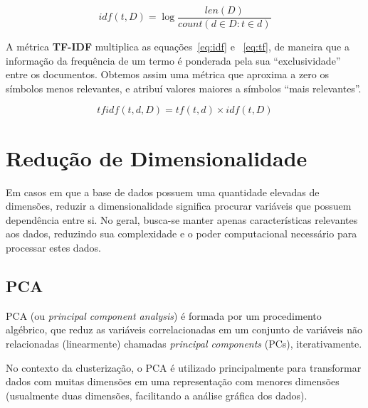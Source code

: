 \begin{equation}\label{eq:idf}
idf(t, D) = \log \frac{len(D)}{count(d \in D : t \in d)}
\end{equation}


A métrica \textbf{TF-IDF} multiplica as equações~\ref{eq:idf} e ~\ref{eq:tf}, de maneira que a informação da frequência de um termo é ponderada pela sua ``exclusividade'' entre os documentos.
Obtemos assim uma métrica que aproxima a zero os símbolos menos relevantes, e atribuí valores maiores a símbolos ``mais relevantes''.

\begin{equation}
tfidf(t, d, D) = tf(t, d) \times idf(t, D)
\end{equation}

 \section{Redução de Dimensionalidade}
 Em casos em que a base de dados possuem uma quantidade elevadas de dimensões, 
reduzir a dimensionalidade significa procurar variáveis que possuem dependência entre si.
No geral, busca-se manter apenas características relevantes aos dados, reduzindo sua complexidade e o poder computacional necessário para processar estes dados.

 \subsection{PCA}
 PCA (ou \emph{principal component analysis}) é formada por um procedimento algébrico, 
 que reduz as variáveis correlacionadas em um conjunto de variáveis não relacionadas (linearmente) chamadas \emph{principal components} (PCs), iterativamente.
 
No contexto da clusterização, o PCA é utilizado principalmente para transformar dados com muitas dimensões em uma representação com menores dimensões (usualmente duas dimensões, facilitando a análise gráfica dos dados).
 
 
